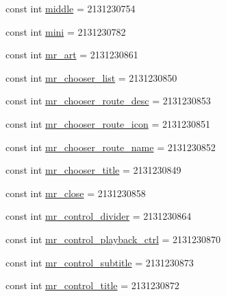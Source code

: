 \begin{DoxyCompactItemize}
\item 
const int \mbox{\hyperlink{class_f_w_p_s___app_1_1_droid_1_1_resource_1_1_id_a158df5edd645aa14444d5372a81f9dca}{middle}} = 2131230754
\item 
const int \mbox{\hyperlink{class_f_w_p_s___app_1_1_droid_1_1_resource_1_1_id_a764968f239c7829903fbc43e6eea6638}{mini}} = 2131230782
\item 
const int \mbox{\hyperlink{class_f_w_p_s___app_1_1_droid_1_1_resource_1_1_id_a266cf96b5ac3c2c5fe02adc79f602ef9}{mr\+\_\+art}} = 2131230861
\item 
const int \mbox{\hyperlink{class_f_w_p_s___app_1_1_droid_1_1_resource_1_1_id_a2d8ef705d3fd55f8aa73f3f5bb78ef3d}{mr\+\_\+chooser\+\_\+list}} = 2131230850
\item 
const int \mbox{\hyperlink{class_f_w_p_s___app_1_1_droid_1_1_resource_1_1_id_a705829bc5ffdfa003e6712f2cf693689}{mr\+\_\+chooser\+\_\+route\+\_\+desc}} = 2131230853
\item 
const int \mbox{\hyperlink{class_f_w_p_s___app_1_1_droid_1_1_resource_1_1_id_acf7dd6529b7da7099fdafe13097ac042}{mr\+\_\+chooser\+\_\+route\+\_\+icon}} = 2131230851
\item 
const int \mbox{\hyperlink{class_f_w_p_s___app_1_1_droid_1_1_resource_1_1_id_a1d737a8880f088aaeb92fd0645eeb24b}{mr\+\_\+chooser\+\_\+route\+\_\+name}} = 2131230852
\item 
const int \mbox{\hyperlink{class_f_w_p_s___app_1_1_droid_1_1_resource_1_1_id_a222969118d55eb96946e60b0455fa246}{mr\+\_\+chooser\+\_\+title}} = 2131230849
\item 
const int \mbox{\hyperlink{class_f_w_p_s___app_1_1_droid_1_1_resource_1_1_id_ab7fb99e84f7085f01722c65582491073}{mr\+\_\+close}} = 2131230858
\item 
const int \mbox{\hyperlink{class_f_w_p_s___app_1_1_droid_1_1_resource_1_1_id_a4d35c1c01a6ba347389e0070079b2c23}{mr\+\_\+control\+\_\+divider}} = 2131230864
\item 
const int \mbox{\hyperlink{class_f_w_p_s___app_1_1_droid_1_1_resource_1_1_id_a258d59c457c299187b1e15a6e53fd88e}{mr\+\_\+control\+\_\+playback\+\_\+ctrl}} = 2131230870
\item 
const int \mbox{\hyperlink{class_f_w_p_s___app_1_1_droid_1_1_resource_1_1_id_a41e827bf03a09fc856222825e769b9ab}{mr\+\_\+control\+\_\+subtitle}} = 2131230873
\item 
const int \mbox{\hyperlink{class_f_w_p_s___app_1_1_droid_1_1_resource_1_1_id_abeb8ff24d2d8414f20a549a497b68d46}{mr\+\_\+control\+\_\+title}} = 2131230872
\item 

\end{DoxyCompactItemize}
